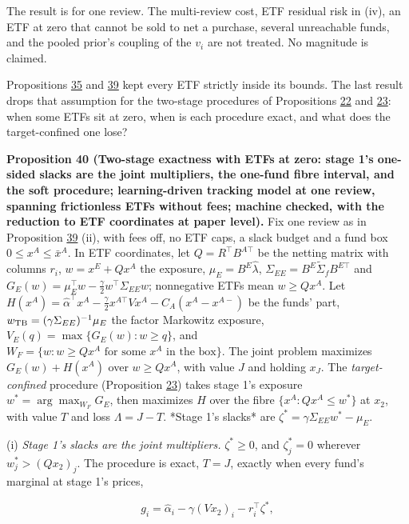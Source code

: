 \documentclass[11pt]{article}
\begin{document}
The result is for one review. The multi-review cost, ETF residual risk
in (iv), an ETF at zero that cannot be sold to net a purchase, several
unreachable funds, and the pooled prior's coupling of the \(v_i\) are not
treated. No magnitude is claimed.

Propositions \hyperref[res:Proposition-35]{35} and \hyperref[res:Proposition-39]{39} kept every ETF strictly inside its bounds. The
last result drops that assumption for the two-stage procedures of
Propositions \hyperref[res:Proposition-22]{22} and \hyperref[res:Proposition-23]{23}: when some ETFs sit at zero, when is each
procedure exact, and what does the target-confined one lose?

\label{res:Proposition-40}
\textbf{Proposition 40 (Two-stage exactness with ETFs at zero: stage 1's one-sided slacks are the joint multipliers, the one-fund fibre interval, and the soft procedure; learning-driven tracking model at one review, spanning frictionless ETFs without fees; machine checked, with the reduction to ETF coordinates at paper level).}
Fix one review as in Proposition \hyperref[res:Proposition-39]{39} (ii), with fees off, no ETF caps,
a slack budget and a fund box \(0\leq x^A\leq\bar x^A\). In ETF coordinates, let
\(Q=R^\top B^{A\top}\) be the netting matrix with columns \(r_i\), \(w=x^E+Qx^A\) the
exposure, \(\mu_E=B^E\hat\lambda\), \(\Sigma_{EE}=B^E\tilde\Sigma_fB^{E\top}\) and
\(G_E(w)=\mu_E^\top w-\frac\gamma2w^\top\Sigma_{EE}w\); nonnegative ETFs mean \(w\geq Qx^A\). Let
\(H(x^A)=\hat\alpha^\top x^A-\frac\gamma2x^{A\top}Vx^A-C_A(x^A-x^{A-})\) be the funds' part, \(w_{\rm TB}=(\gamma\Sigma_{EE})^{-1}\mu_E\)
the factor Markowitz exposure, \(V_E(q)=\max\{G_E(w):w\geq q\}\), and
\(W_F=\{w:w\geq Qx^A\text{ for some }x^A\text{ in the box}\}\). The joint problem
maximizes \(G_E(w)+H(x^A)\) over \(w\geq Qx^A\), with value \(J\) and holding \(x_J\).
The \emph{target-confined} procedure (Proposition \hyperref[res:Proposition-23]{23}) takes stage 1's
exposure \(w^*=\arg\max_{W_F}G_E\), then maximizes \(H\) over the fibre
\(\{x^A:Qx^A\leq w^*\}\) at \(x_2\), with value \(T\) and loss \(\Lambda=J-T\). *Stage 1's
slacks* are \(\zeta^*=\gamma\Sigma_{EE}w^*-\mu_E\).

(i) \emph{Stage 1's slacks are the joint multipliers.} \(\zeta^*\geq0\), and
\(\zeta^*_j=0\) wherever \(w^*_j>(Qx_2)_j\). The procedure is exact, \(T=J\), exactly
when every fund's marginal at stage 1's prices,

\begin{equation*}
g_i=\hat\alpha_i-\gamma(Vx_2)_i-r_i^\top\zeta^*,\tag{129}\label{eq:129}
\end{equation*}
\end{document}
